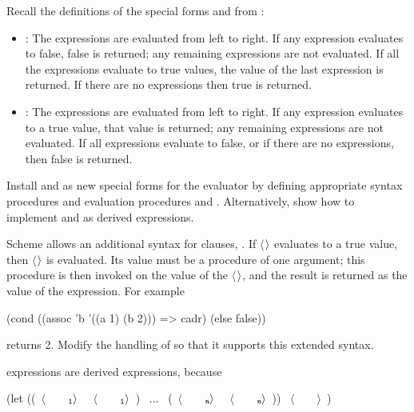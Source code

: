 \begin{exerciseGroup}
\label{Exercise 4.4}
 Recall the definitions of the
special forms  and  from :

\begin{itemize}
\item
{}: The expressions are evaluated from left to right.  If any
expression evaluates to false, false is returned; any remaining expressions are
not evaluated.  If all the expressions evaluate to true values, the value of
the last expression is returned.  If there are no expressions then true is
returned.

\item
{}: The expressions are evaluated from left to right.  If any expression
evaluates to a true value, that value is returned; any remaining expressions
are not evaluated.  If all expressions evaluate to false, or if there are no
expressions, then false is returned.
\end{itemize}

Install  and  as new special forms for the evaluator by
defining appropriate syntax procedures and evaluation procedures
 and .  Alternatively, show how to implement
 and  as derived expressions.

\label{Exercise 4.5}
 Scheme allows an additional syntax
for  clauses, .  If
\( \langle \)\( \kern0.08em\rangle \) evaluates to a true value, then \( \langle \)\( \kern0.08em\rangle \) is evaluated.
Its value must be a procedure of one argument; this procedure is then invoked
on the value of the \( \langle \)\( \kern0.08em\rangle \), and the result is returned as the value of
the  expression.  For example

\begin{codeBlock}
(cond ((assoc 'b '((a 1) (b 2))) => cadr)
      (else false))
\end{codeBlock}

\noindent
returns 2.  Modify the handling of  so that it supports this
extended syntax.

\label{Exercise 4.6}
  expressions are derived
expressions, because

\begin{codeBlock}
(let ((~\(\langle \)~~~~\(_{\mono{1}}\rangle \)~ ~\(\langle \)~~~~\(_{\mono{1}}\rangle \)~) ~\( \dots \)~ (~\(\langle \)~~~~\(_{\monoItalic{n}}\rangle \)~ ~\(\langle \)~~~~\(_{\monoItalic{n}}\rangle \)~))
  ~\(\langle \)~~~~\(\rangle \)~)
\end{codeBlock}


\end{exerciseGroup}
